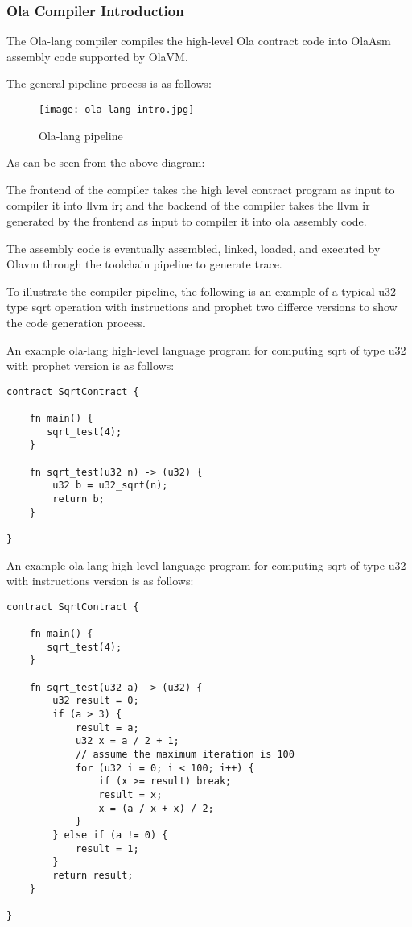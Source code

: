 \subsubsection{Ola Compiler Introduction}

The Ola-lang compiler compiles the high-level Ola contract code into OlaAsm assembly code supported by OlaVM. 

The general pipeline process is as follows:

\begin{figure}[!htp]
    \centering
    \texttt{[image: ola-lang-intro.jpg]}
    \caption{Ola-lang pipeline}
    \label{fig:ola-lang-intro}
\end{figure}

As can be seen from the above diagram:

The frontend of the compiler takes the high level contract program as input to compiler it into llvm ir;
and the backend of the compiler takes the llvm ir generated by the frontend as input to compiler it into ola assembly code.

The assembly code is eventually assembled, linked, loaded, and executed by Olavm through the toolchain pipeline to generate trace.


To illustrate the compiler pipeline, the following is an example of a typical u32 type sqrt operation with instructions and prophet two differce versions to show the code generation process.

An example ola-lang high-level language program for computing sqrt of type u32 with prophet version is as follows:
\begin{lstlisting}[language={}]
contract SqrtContract {

    fn main() {
       sqrt_test(4);
    }

    fn sqrt_test(u32 n) -> (u32) {
        u32 b = u32_sqrt(n);
        return b;
    }

}
\end{lstlisting}


An example ola-lang high-level language program for computing sqrt of type u32 with instructions version is as follows:
\begin{lstlisting}[language={}]
contract SqrtContract {

    fn main() {
       sqrt_test(4);
    }

    fn sqrt_test(u32 a) -> (u32) {
        u32 result = 0;
        if (a > 3) {
            result = a;
            u32 x = a / 2 + 1;
            // assume the maximum iteration is 100
            for (u32 i = 0; i < 100; i++) {
                if (x >= result) break;
                result = x;
                x = (a / x + x) / 2;
            }
        } else if (a != 0) {
            result = 1;
        }
        return result;
    }

}
\end{lstlisting}
